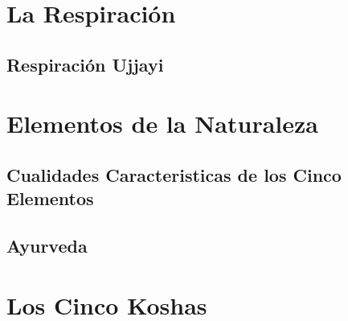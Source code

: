 \section{La Respiración}
\subsection{Respiración Ujjayi}
\section{Elementos de la Naturaleza}
\subsection{Cualidades Caracteristicas de los Cinco Elementos}
\subsection{Ayurveda}
\section{Los Cinco Koshas}


